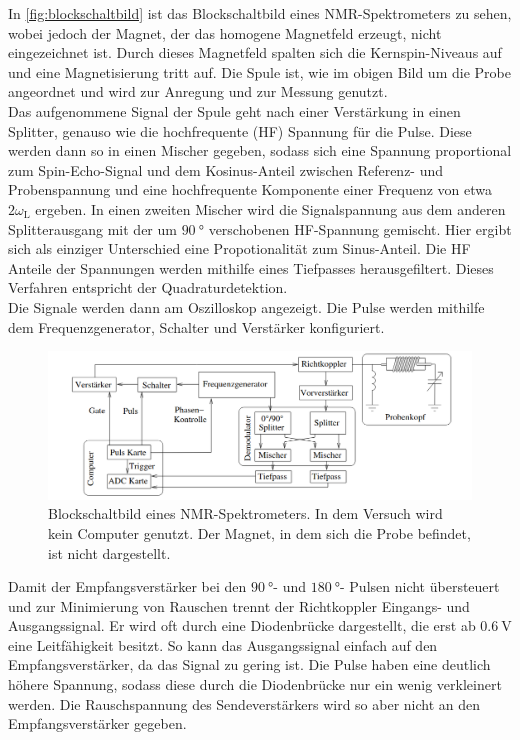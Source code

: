         \noindent In \autoref{fig:blockschaltbild} ist das Blockschaltbild eines NMR-Spektrometers zu sehen, wobei jedoch der Magnet, der das homogene Magnetfeld erzeugt, nicht eingezeichnet ist. Durch dieses Magnetfeld 
        spalten sich die Kernspin-Niveaus auf und eine Magnetisierung tritt auf. Die Spule ist, wie im obigen Bild um die Probe angeordnet und wird zur Anregung und zur Messung genutzt. \\
        Das aufgenommene Signal der Spule geht nach einer Verstärkung in einen Splitter, genauso wie die hochfrequente (HF) Spannung für die Pulse. Diese werden dann so in einen Mischer gegeben, sodass sich 
        eine Spannung proportional zum Spin-Echo-Signal und dem Kosinus-Anteil zwischen Referenz- und Probenspannung und eine hochfrequente Komponente einer Frequenz von etwa $2\omega_\text{L}$ ergeben. 
        In einen zweiten Mischer wird die Signalspannung aus dem anderen Splitterausgang mit der um $\SI{90}{\degree}$ verschobenen HF-Spannung gemischt. Hier ergibt sich als einziger Unterschied eine 
        Propotionalität zum Sinus-Anteil. Die HF Anteile der Spannungen werden mithilfe eines Tiefpasses herausgefiltert. Dieses Verfahren entspricht der Quadraturdetektion. \\ 
        Die Signale werden dann am Oszilloskop angezeigt. 
        Die Pulse werden mithilfe dem Frequenzgenerator, Schalter und Verstärker konfiguriert.

        \begin{figure}[H]
            \centering
            \includegraphics[width=\textwidth]{latex/images/blockschaltbild_nmr.png}
            \caption{Blockschaltbild eines NMR-Spektrometers. In dem Versuch wird kein Computer genutzt. Der Magnet, in dem sich die Probe befindet, ist nicht dargestellt. \cite{grundlagen}}
            \label{fig:blockschaltbild}
        \end{figure}

        \noindent Damit der Empfangsverstärker bei den $\SI{90}{\degree}$- und $\SI{180}{\degree}$- Pulsen nicht übersteuert und zur Minimierung von Rauschen trennt der Richtkoppler Eingangs- und Ausgangssignal. 
        Er wird oft durch eine Diodenbrücke dargestellt, die erst ab $\SI{0.6}{\volt}$ eine Leitfähigkeit besitzt. So kann das Ausgangssignal einfach auf den Empfangsverstärker, da das Signal zu gering ist. 
        Die Pulse haben eine deutlich höhere Spannung, sodass diese durch die Diodenbrücke nur ein wenig verkleinert werden. Die Rauschspannung des Sendeverstärkers wird so aber nicht an den Empfangsverstärker 
        gegeben. 

